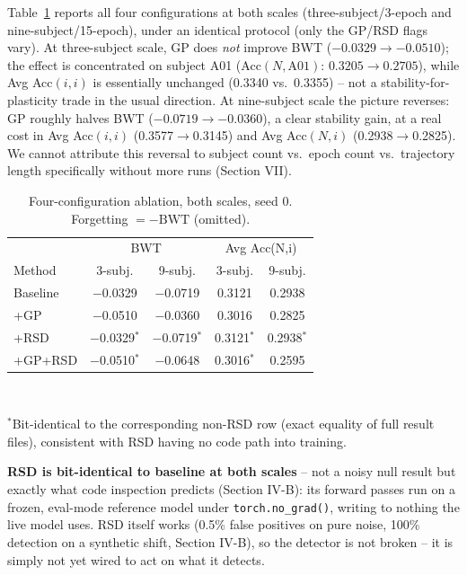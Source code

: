\documentclass[conference]{IEEEtran}
\begin{document}
Table~\ref{tab:ablation} reports all four configurations at both scales (three-subject/3-epoch and nine-subject/15-epoch), under an identical protocol (only the GP/RSD flags vary). At three-subject scale, GP does \emph{not} improve BWT ($-0.0329\to-0.0510$); the effect is concentrated on subject A01 (Acc$(N,\text{A01})$: $0.3205\to0.2705$), while Avg Acc$(i,i)$ is essentially unchanged (0.3340 vs.\ 0.3355) -- not a stability-for-plasticity trade in the usual direction. At nine-subject scale the picture reverses: GP roughly halves BWT ($-0.0719\to-0.0360$), a clear stability gain, at a real cost in Avg Acc$(i,i)$ (0.3577$\to$0.3145) and Avg Acc$(N,i)$ (0.2938$\to$0.2825). We cannot attribute this reversal to subject count vs.\ epoch count vs.\ trajectory length specifically without more runs (Section VII).

\begin{table}[t]
\caption{Four-configuration ablation, both scales, seed 0. Forgetting $=-\mathrm{BWT}$ (omitted).}
\label{tab:ablation}
\centering
\begin{tabular}{@{}lcccc@{}}
\toprule
& \multicolumn{2}{c}{BWT} & \multicolumn{2}{c}{Avg Acc(N,i)} \\
Method & 3-subj. & 9-subj. & 3-subj. & 9-subj. \\
\midrule
Baseline & $-$0.0329 & $-$0.0719 & 0.3121 & 0.2938 \\
+GP & $-$0.0510 & $-$0.0360 & 0.3016 & 0.2825 \\
+RSD & $-$0.0329$^{*}$ & $-$0.0719$^{*}$ & 0.3121$^{*}$ & 0.2938$^{*}$ \\
+GP+RSD & $-$0.0510$^{*}$ & $-$0.0648 & 0.3016$^{*}$ & 0.2595 \\
\bottomrule
\end{tabular}
\\[2pt]
\raggedright\footnotesize $^{*}$Bit-identical to the corresponding non-RSD row (exact equality of full result files), consistent with RSD having no code path into training.
\end{table}

\textbf{RSD is bit-identical to baseline at both scales} -- not a noisy null result but exactly what code inspection predicts (Section IV-B): its forward passes run on a frozen, eval-mode reference model under \texttt{torch.no\_grad()}, writing to nothing the live model uses. RSD itself works (0.5\% false positives on pure noise, 100\% detection on a synthetic shift, Section IV-B), so the detector is not broken -- it is simply not yet wired to act on what it detects.
\end{document}

